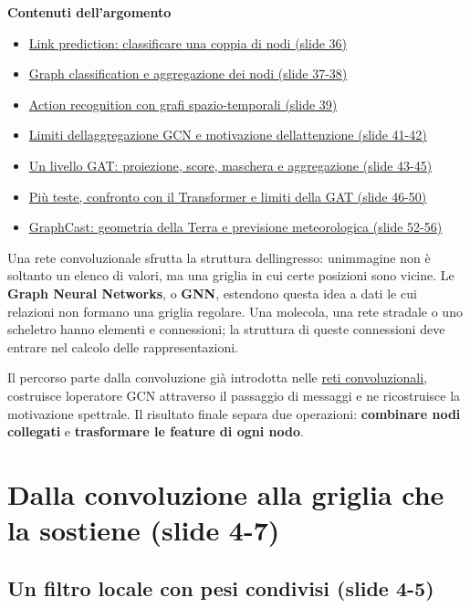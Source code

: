 \documentclass[11pt,a4paper,oneside,openany]{book}
\newenvironment{indiceargomento}{\begingroup\small\sffamily\color{grigio}\textbf{Contenuti dell'argomento}\par\begin{itemize}\setlength{\itemsep}{0pt}\setlength{\parskip}{0pt}}{\end{itemize}\endgroup\medskip}
\begin{document}
\begin{indiceargomento}
\item \hyperref[f05-n30-r656]{Link prediction: classificare una coppia di nodi (slide 36)}
\item \hyperref[f05-n30-r690]{Graph classification e aggregazione dei nodi (slide 37-38)}
\item \hyperref[f05-n30-r766]{Action recognition con grafi spazio-temporali (slide 39)}
\item \hyperref[f05-n30-r801]{Limiti dell\textquotesingle aggregazione GCN e motivazione dell\textquotesingle attenzione (slide 41-42)}
\item \hyperref[f05-n30-r822]{Un livello GAT: proiezione, score, maschera e aggregazione (slide 43-45)}
\item \hyperref[f05-n30-r948]{Più teste, confronto con il Transformer e limiti della GAT (slide 46-50)}
\item \hyperref[f05-n30-r994]{GraphCast: geometria della Terra e previsione meteorologica (slide 52-56)}
\end{indiceargomento}

Una rete convoluzionale sfrutta la struttura dell\textquotesingle ingresso: un\textquotesingle immagine non è soltanto un elenco di valori, ma una griglia in cui certe posizioni sono vicine. Le \textbf{Graph Neural Networks}, o \textbf{GNN}, estendono questa idea a dati le cui relazioni non formano una griglia regolare. Una molecola, una rete stradale o uno scheletro hanno elementi e connessioni; la struttura di queste connessioni deve entrare nel calcolo delle rappresentazioni.

Il percorso parte dalla convoluzione già introdotta nelle \hyperref[fonte02]{reti convoluzionali}, costruisce l\textquotesingle operatore GCN attraverso il passaggio di messaggi e ne ricostruisce la motivazione spettrale. Il risultato finale separa due operazioni: \textbf{combinare nodi collegati} e \textbf{trasformare le feature di ogni nodo}.

\section{Dalla convoluzione alla griglia che la sostiene (slide 4-7)}\label{f05-r18}

\subsection{Un filtro locale con pesi condivisi (slide 4-5)}\label{f05-r20}
\end{document}
